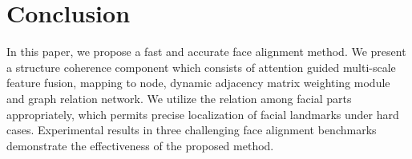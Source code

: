 \documentclass[runningheads]{llncs}
\begin{document}
\section{Conclusion}
In this paper, we propose a fast and accurate face alignment method.
We present a structure coherence component which consists of attention guided multi-scale feature fusion, mapping to node, dynamic adjacency matrix weighting module and graph relation network.
We utilize the relation among facial parts appropriately, which permits precise localization of facial landmarks under hard cases.
Experimental results in three challenging face alignment benchmarks demonstrate the effectiveness of the proposed method.


\clearpage


\end{document}
